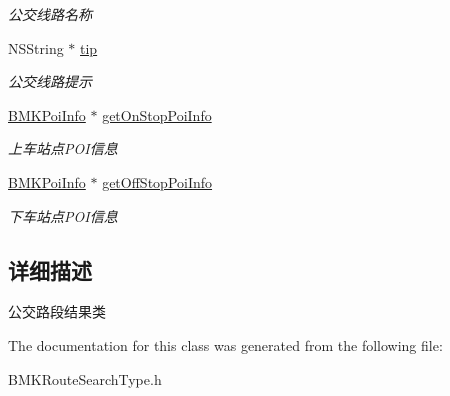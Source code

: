 \begin{DoxyCompactItemize}
\begin{DoxyCompactList}\small\item\em 公交线路名称 \end{DoxyCompactList}\item 
\hypertarget{interface_b_m_k_line_a80154f88b4a14dcf2c4aedb966666a55}{N\-S\-String $\ast$ \hyperlink{interface_b_m_k_line_a80154f88b4a14dcf2c4aedb966666a55}{tip}}\label{interface_b_m_k_line_a80154f88b4a14dcf2c4aedb966666a55}

\begin{DoxyCompactList}\small\item\em 公交线路提示 \end{DoxyCompactList}\item 
\hypertarget{interface_b_m_k_line_a53866e3b80ad5a960932ca08a669d529}{\hyperlink{interface_b_m_k_poi_info}{B\-M\-K\-Poi\-Info} $\ast$ \hyperlink{interface_b_m_k_line_a53866e3b80ad5a960932ca08a669d529}{get\-On\-Stop\-Poi\-Info}}\label{interface_b_m_k_line_a53866e3b80ad5a960932ca08a669d529}

\begin{DoxyCompactList}\small\item\em 上车站点\-P\-O\-I信息 \end{DoxyCompactList}\item 
\hypertarget{interface_b_m_k_line_abb6b1b3baacc5038a187b0a36925ed50}{\hyperlink{interface_b_m_k_poi_info}{B\-M\-K\-Poi\-Info} $\ast$ \hyperlink{interface_b_m_k_line_abb6b1b3baacc5038a187b0a36925ed50}{get\-Off\-Stop\-Poi\-Info}}\label{interface_b_m_k_line_abb6b1b3baacc5038a187b0a36925ed50}

\begin{DoxyCompactList}\small\item\em 下车站点\-P\-O\-I信息 \end{DoxyCompactList}\end{DoxyCompactItemize}


\subsection{详细描述}
公交路段结果类 

The documentation for this class was generated from the following file\-:\begin{DoxyCompactItemize}
\item 
B\-M\-K\-Route\-Search\-Type.\-h\end{DoxyCompactItemize}
